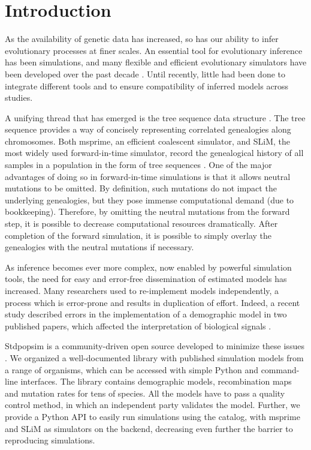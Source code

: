 \section{Introduction}

As the availability of genetic data has increased,
so has our ability to infer evolutionary processes at finer scales.
An essential tool for evolutionary inference has been simulations,
and many flexible and efficient evolutionary simulators have been developed over the past decade \citep{hudson_testing_1983, hudson_test_1987, carvajal-rodriguez_simulation_2008, ohta_simulation_1974, hoban_computer_2012, bulmer_effect_1976}.
Until recently, little had been done to integrate different tools and to ensure compatibility of inferred models across studies.

A unifying thread that has emerged is the tree sequence data structure \citep{kelleher_efficient_2016}.
The tree sequence provides a way of concisely representing correlated genealogies along chromosomes.
Both msprime, an efficient coalescent simulator, and SLiM, the most widely used forward-in-time simulator,
record the genealogical history of all samples in a population in the form of tree sequences \citep{kelleher_efficient_2018, haller_tree-sequence_2019, haller_slim_2019}.
One of the major advantages of doing so in forward-in-time simulations is that it allows neutral mutations to be omitted.
By definition, such mutations do not impact the underlying genealogies, but they pose immense computational demand (due to bookkeeping).
Therefore, by omitting the neutral mutations from the forward step, it is possible to decrease computational resources dramatically.
After completion of the forward simulation, it is possible to simply overlay the genealogies with the neutral mutations if necessary.

As inference becomes ever more complex, now enabled by powerful simulation tools,
the need for easy and error-free dissemination of estimated models has increased.
Many researchers used to re-implement models independently,
a process which is error-prone and results in duplication of effort.
Indeed, a recent study described errors in the implementation of a demographic model in two published papers,
which affected the interpretation of biological signals \citep{ragsdale_lessons_2020}.

Stdpopsim is a community-driven open source developed to minimize these issues \citep{adrion_community-maintained_2020, lauterbur_expanding_2023}.
We organized a well-documented library with published simulation models from a range of organisms,
which can be accessed with simple Python and command-line interfaces.
The library contains demographic models, recombination maps and mutation rates for tens of species.
All the models have to pass a quality control method, in which an independent party validates the model.
Further, we provide a Python API to easily run simulations using the catalog, with msprime and SLiM as simulators on the backend,
decreasing even further the barrier to reproducing simulations.

